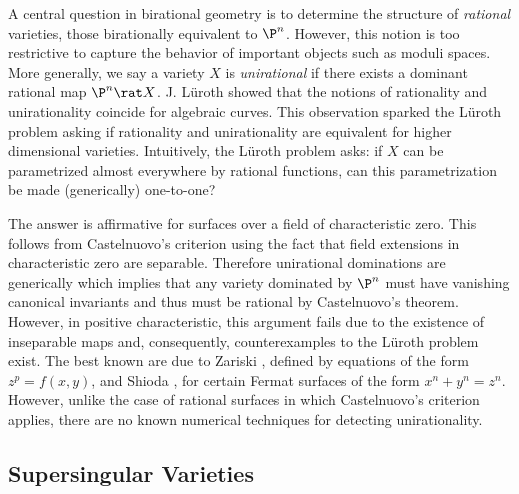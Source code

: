 \documentclass[12pt]{amsart}
\begin{document}
A central question in birational geometry is to determine the structure of \textit{rational} varieties, those birationally equivalent to $\P^n$. However, this notion is too restrictive to capture the behavior of important objects such as moduli spaces. More generally, we say a variety $X$ is \textit{unirational} if there exists a dominant rational map $\P^n \rat X$. J. L\"{u}roth showed \cite{Luroth} that the notions of rationality and unirationality coincide for algebraic curves. This observation sparked the L\"{u}roth problem asking if rationality and unirationality are equivalent for higher dimensional varieties. Intuitively, the L\"{u}roth problem asks: if $X$ can be parametrized almost everywhere by rational functions, can this parametrization be made (generically) one-to-one? 
\par
The answer is affirmative for surfaces over a field of characteristic zero. This follows from Castelnuovo's criterion using the fact that field extensions in characteristic zero are separable. Therefore unirational dominations are generically \etale which implies that any variety dominated by $\P^n$ must have vanishing canonical invariants and thus must be rational by Castelnuovo's theorem. However, in positive characteristic, this argument fails due to the existence of inseparable maps and, consequently, counterexamples to the L\"{u}roth problem exist. The best known are due to Zariski \cite{zariski1958}, defined  by equations of the form $z^p = f(x, y)$, and Shioda \cite{shioda1974}, for certain Fermat surfaces of the form $x^n + y^n = z^n$. However, unlike the case of rational surfaces in which Castelnuovo's criterion applies, there are no known numerical techniques for detecting unirationality.

\subsection*{Supersingular Varieties}
\end{document}
